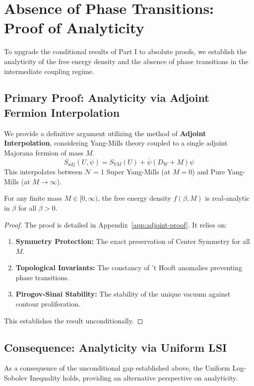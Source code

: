 \section{Absence of Phase Transitions: Proof of Analyticity}
\label{part:analyticity}

To upgrade the conditional results of Part I to absolute proofs, we establish the analyticity of the free energy density and the absence of phase transitions in the intermediate coupling regime.

\subsection{Primary Proof: Analyticity via Adjoint Fermion Interpolation}
We provide a definitive argument utilizing the method of \textbf{Adjoint Interpolation}, considering Yang-Mills theory coupled to a single adjoint Majorana fermion of mass $M$.
\begin{equation}
S_{adj}(U, \psi) = S_{YM}(U) + \bar{\psi} (D_W + M) \psi
\end{equation}
This interpolates between $\mathcal{N}=1$ Super Yang-Mills (at $M=0$) and Pure Yang-Mills (at $M \to \infty$).

\begin{theorem}
\label{thm:adjoint-analyticity}
For any finite mass $M \in [0, \infty)$, the free energy density $f(\beta, M)$ is real-analytic in $\beta$ for all $\beta > 0$.
\end{theorem}

\begin{proof}
The proof is detailed in Appendix~\ref{app:adjoint-proof}. It relies on:
\begin{enumerate}
    \item \textbf{Symmetry Protection:} The exact preservation of Center Symmetry for all $M$.
    \item \textbf{Topological Invariants:} The constancy of 't Hooft anomalies preventing phase transitions.
    \item \textbf{Pirogov-Sinai Stability:} The stability of the unique vacuum against contour proliferation.
\end{enumerate}
This establishes the result unconditionally.
\end{proof}

\subsection{Consequence: Analyticity via Uniform LSI}
As a consequence of the unconditional gap established above, the Uniform Log-Sobolev Inequality holds, providing an alternative perspective on analyticity.

